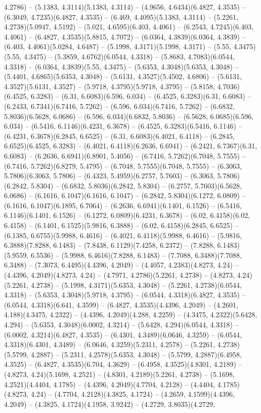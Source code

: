 4.2786) -- (5.1383, 4.3114)(5.1383, 4.3114) -- (4.9656, 4.6434)(6.4827, 4.3535) -- (6.3049, 4.7235)(6.4827, 4.3535) -- (6.469, 4.4095)(5.1383, 4.3114) -- (5.2261, 4.2738)(5.0947, 4.5192) -- (5.021, 4.6595)(6.403, 4.4061) -- (6.2543, 4.7245)(6.403, 4.4061) -- (6.4827, 4.3535)(5.8815, 4.7072) -- (6.0364, 4.3839)(6.0364, 4.3839) -- (6.403, 4.4061)(5.0284, 4.6487) -- (5.1998, 4.3171)(5.1998, 4.3171) -- (5.55, 4.3475)(5.55, 4.3475) -- (5.3859, 4.6762)(6.0544, 4.3318) -- (5.8683, 4.7083)(6.0544, 4.3318) -- (6.0364, 4.3839)(5.55, 4.3475) -- (5.6353, 4.3048)(5.6353, 4.3048) -- (5.4401, 4.6865)(5.6353, 4.3048) -- (5.6131, 4.3527)(5.4502, 4.6806) -- (5.6131, 4.3527)(5.6131, 4.3527) -- (5.9718, 4.3795)(5.9718, 4.3795) -- (5.8158, 4.7036)(6.4525, 6.3283) -- (6.31, 6.6083)(6.596, 6.034) -- (6.4525, 6.3283)(6.31, 6.6083) -- (6.2433, 6.7341)(6.7416, 5.7262) -- (6.596, 6.034)(6.7416, 5.7262) -- (6.6832, 5.8036)(6.5628, 6.0686) -- (6.596, 6.034)(6.6832, 5.8036) -- (6.5628, 6.0685)(6.596, 6.034) -- (6.5416, 6.1146)(6.4231, 6.3678) -- (6.4525, 6.3283)(6.5416, 6.1146) -- (6.4231, 6.3678)(6.2845, 6.6525) -- (6.31, 6.6083)(6.4021, 6.4118) -- (6.2845, 6.6525)(6.4525, 6.3283) -- (6.4021, 6.4118)(6.2636, 6.6941) -- (6.2421, 6.7367)(6.31, 6.6083) -- (6.2636, 6.6941)(6.8901, 5.4056) -- (6.7416, 5.7262)(6.7048, 5.7555) -- (6.7416, 5.7262)(6.8279, 5.4795) -- (6.7048, 5.7555)(6.7048, 5.7555) -- (6.3063, 5.7806)(6.3063, 5.7806) -- (6.4323, 5.4959)(6.2757, 5.7603) -- (6.3063, 5.7806)(6.2842, 5.8304) -- (6.6832, 5.8036)(6.2842, 5.8304) -- (6.2757, 5.7603)(6.5628, 6.0686) -- (6.1616, 6.1047)(6.1616, 6.1047) -- (6.2842, 5.8304)(6.1272, 6.0809) -- (6.1616, 6.1047)(6.1895, 6.7064) -- (6.2636, 6.6941)(6.1401, 6.1526) -- (6.5416, 6.1146)(6.1401, 6.1526) -- (6.1272, 6.0809)(6.4231, 6.3678) -- (6.02, 6.4158)(6.02, 6.4158) -- (6.1401, 6.1525)(5.9816, 6.3888) -- (6.02, 6.4158)(6.2845, 6.6525) -- (6.1385, 6.6755)(5.9988, 6.4616) -- (6.4021, 6.4118)(5.9988, 6.4616) -- (5.9816, 6.3888)(7.8288, 6.1483) -- (7.8438, 6.1129)(7.4258, 6.2372) -- (7.8288, 6.1483)(5.9559, 6.5536) -- (5.9988, 6.4616)(7.8288, 6.1483) -- (7.7088, 6.3488)(7.7088, 6.3488) -- (7.3073, 6.4495)(4.4396, 4.2049) -- (4.4057, 4.2383)(4.8273, 4.24) -- (4.4396, 4.2049)(4.8273, 4.24) -- (4.7971, 4.2786)(5.2261, 4.2738) -- (4.8273, 4.24)(5.2261, 4.2738) -- (5.1998, 4.3171)(5.6353, 4.3048) -- (5.2261, 4.2738)(6.0544, 4.3318) -- (5.6353, 4.3048)(5.9718, 4.3795) -- (6.0544, 4.3318)(6.4827, 4.3535) -- (6.0544, 4.3318)(6.641, 4.3599) -- (6.4827, 4.3535)(4.4396, 4.2049) -- (4.2601, 4.188)(4.3475, 4.2322) -- (4.4396, 4.2049)(4.288, 4.2259) -- (4.3475, 4.2322)(5.6428, 4.294) -- (5.6353, 4.3048)(6.0002, 4.3214) -- (5.6428, 4.294)(6.0544, 4.3318) -- (6.0002, 4.3214)(6.4827, 4.3535) -- (6.4301, 4.3489)(6.0646, 4.3259) -- (6.0544, 4.3318)(6.4301, 4.3489) -- (6.0646, 4.3259)(5.2311, 4.2578) -- (5.2261, 4.2738)(5.5799, 4.2887) -- (5.2311, 4.2578)(5.6353, 4.3048) -- (5.5799, 4.2887)(6.4958, 4.3525) -- (6.4827, 4.3535)(6.704, 4.3629) -- (6.4958, 4.3525)(4.8301, 4.2189) -- (4.8273, 4.24)(5.1698, 4.2521) -- (4.8301, 4.2189)(5.2261, 4.2738) -- (5.1698, 4.2521)(4.4404, 4.1785) -- (4.4396, 4.2049)(4.7704, 4.2128) -- (4.4404, 4.1785)(4.8273, 4.24) -- (4.7704, 4.2128)(4.3825, 4.1724) -- (4.2659, 4.1599)(4.4396, 4.2049) -- (4.3825, 4.1724)(4.1958, 3.9242) -- (4.2729, 3.8035)(4.2729, 